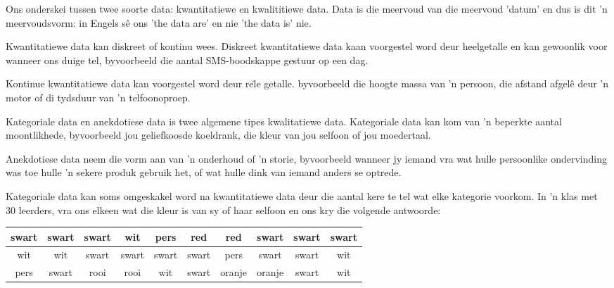 Ons onderskei tussen twee soorte data: kwantitatiewe en kwalititiewe data. Data is die meervoud van die meervoud 'datum' en dus is dit 'n meervoudsvorm: in Engels s\^e ons 'the data are' en nie 'the data is' nie.


Kwantitatiewe data kan diskreet of kontinu wees. Diskreet kwantitatiewe data kaan voorgestel word deur heelgetalle en kan gewoonlik voor wanneer ons duige tel, byvoorbeeld die aantal SMS-boodskappe gestuur op een dag.\par

Kontinue kwantitatiewe data kan voorgestel word deur re\"le getalle. byvoorbeeld die hoogte massa van 'n persoon, die afstand afgel\^e deur 'n motor of di tydsduur van 'n telfoonoproep.


Kategoriale data en anekdotiese data is twee algemene tipes kwalitatiewe data. Kategoriale data kan kom van ’n beperkte aantal moontlikhede, byvoorbeeld jou geliefkoosde koeldrank, die kleur van jou selfoon of jou moedertaal. \par

Anekdotiese data neem die vorm aan van ’n onderhoud of ’n storie, byvoorbeeld wanneer jy iemand vra wat hulle persoonlike ondervinding was toe hulle ’n sekere produk gebruik het, of wat hulle dink van iemand anders se optrede. \par

Kategoriale data kan soms omgeskakel word na kwantitatiewe data deur die aantal kere te tel wat elke kategorie voorkom. In ’n klas met $30$ leerders, vra ons elkeen wat die kleur is van sy of haar selfoon en ons kry die volgende antwoorde:

  \begin{center}
    \begin{tabular}{|c|c|c|c|c|c|c|c|c|c|}\hline
     
      swart & swart & swart & wit & pers & red & red & swart & swart & swart \\ \hline
      wit & wit & swart & swart & swart & swart & pers & swart & swart & wit \\ \hline
      pers & swart & rooi & rooi & wit & swart & oranje & oranje & swart & wit \\ \hline
     
    \end{tabular}
  \end{center}

